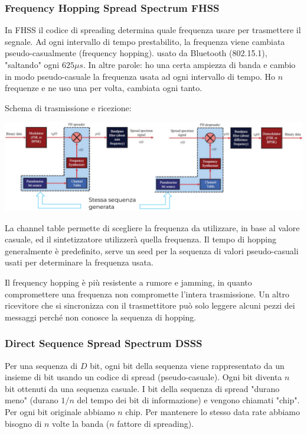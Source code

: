 \subsubsection{Frequency Hopping Spread Spectrum FHSS}

In FHSS il codice di spreading determina quale frequenza usare per trasmettere il segnale. Ad ogni intervallo di tempo prestabilito, la frequenza viene cambiata pseudo-casualmente (frequency hopping). usato da Bluetooth (802.15.1), "saltando" ogni $625 \mu s$.
In altre parole: ho una certa ampiezza di banda e cambio in modo pseudo-casuale la frequenza usata ad ogni intervallo di tempo. Ho $n$ frequenze e ne uso una per volta, cambiata ogni tanto.

Schema di trasmissione e ricezione:
\begin{center}
	\includegraphics[width=\linewidth]{img/wireless/fhss1}
\end{center}
La channel table permette di scegliere la frequenza da utilizzare, in base al valore casuale, ed il sintetizzatore utilizzerà quella frequenza. Il tempo di hopping generalmente è predefinito, serve un seed per la sequenza di valori pseudo-casuali usati per determinare la frequenza usata.

Il frequency hopping è più resistente a rumore e jamming, in quanto compromettere una frequenza non compromette l'intera trasmissione.
Un altro ricevitore che si sincronizza con il trasmettitore può solo leggere alcuni pezzi dei messaggi perché non conosce la sequenza di hopping. 

\subsubsection{Direct Sequence Spread Spectrum DSSS}

Per una sequenza di $D$ bit, ogni bit della sequenza viene rappresentato da un insieme di bit usando un codice di spread (pseudo-casuale). Ogni bit diventa $n$ bit ottenuti da una sequenza casuale. 
I bit della sequenza di spread "durano meno" (durano $1/n$ del tempo dei bit di informazione) e vengono chiamati "chip". Per ogni bit originale abbiamo $n$ chip.
Per mantenere lo stesso data rate abbiamo bisogno di $n$ volte la banda ($n$ fattore di spreading).

